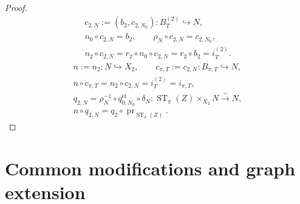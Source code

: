 \begin{proof}
  \[
  \begin{gathered}
    c_{2,N}:=(b_2,c_{2,N_0})\colon B_T^{(2)}\hookrightarrow N,\\
    n_0\circ c_{2,N}=b_2,
    \qquad
    \rho_N\circ c_{2,N}=c_{2,N_0},\\
    n_2\circ c_{2,N}
      =r_2\circ n_0\circ c_{2,N}
      =r_2\circ b_2=i_T^{(2)}.
  \end{gathered}
  \]
  \[
  \begin{gathered}
    n:=n_2\colon N\hookrightarrow X_2,\qquad
    c_{\pi,T}:=c_{2,N}\colon B_{\pi,T}\hookrightarrow N,\\
    n\circ c_{\pi,T}
      =n_2\circ c_{2,N}=i_T^{(2)}=i_{\pi,T},\\
    q_{2,N}=\rho_N^{-1}\circ q^{\mathrm{el}}_{0,N_0}\circ\delta_N
      \colon\operatorname{ST}_\pi(Z)\times_{X_2}N\xrightarrow{\sim}N,\\
    n\circ q_{2,N}
      =q_2\circ\operatorname{pr}_{\operatorname{ST}_\pi(Z)}.
  \end{gathered}                                                   \tag{IC6}
  \]
\end{proof}


\section{Common modifications and graph extension}

